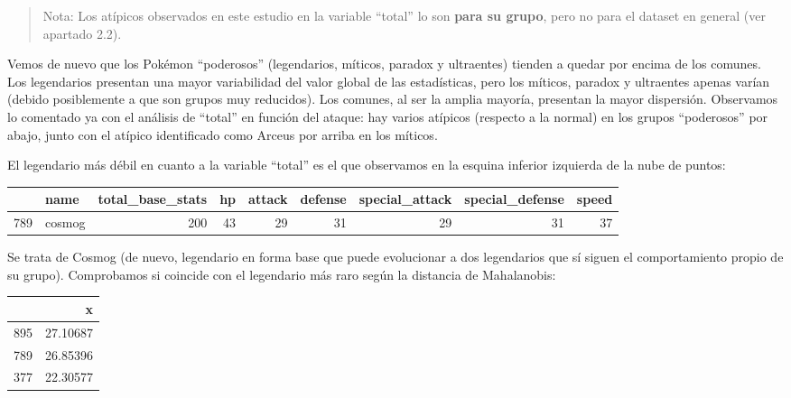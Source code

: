 \documentclass[
  12pt,
]{extreport}
\begin{document}
\begin{quote}
Nota: Los atípicos observados en este estudio en la variable ``total''
lo son \textbf{para su grupo}, pero no para el dataset en general (ver
apartado 2.2).
\end{quote}

Vemos de nuevo que los Pokémon ``poderosos'' (legendarios, míticos,
paradox y ultraentes) tienden a quedar por encima de los comunes. Los
legendarios presentan una mayor variabilidad del valor global de las
estadísticas, pero los míticos, paradox y ultraentes apenas varían
(debido posiblemente a que son grupos muy reducidos). Los comunes, al
ser la amplia mayoría, presentan la mayor dispersión. Observamos lo
comentado ya con el análisis de ``total'' en función del ataque: hay
varios atípicos (respecto a la normal) en los grupos ``poderosos'' por
abajo, junto con el atípico identificado como Arceus por arriba en los
míticos.

El legendario más débil en cuanto a la variable ``total'' es el que
observamos en la esquina inferior izquierda de la nube de puntos:

\begin{table}[H]
\centering\begingroup\fontsize{9.5}{11.5}\selectfont

\begin{tabular}{llrrrrrrr}
\toprule
  & name & total\_base\_stats & hp & attack & defense & special\_attack & special\_defense & speed\\
\midrule
789 & cosmog & 200 & 43 & 29 & 31 & 29 & 31 & 37\\
\bottomrule
\end{tabular}
\endgroup{}
\end{table}

Se trata de Cosmog (de nuevo, legendario en forma base que puede
evolucionar a dos legendarios que sí siguen el comportamiento propio de
su grupo). Comprobamos si coincide con el legendario más raro según la
distancia de Mahalanobis:

\begin{table}[H]
\centering\begingroup\fontsize{9.5}{11.5}\selectfont

\begin{tabular}{lr}
\toprule
  & x\\
\midrule
895 & 27.10687\\
789 & 26.85396\\
377 & 22.30577\\
\bottomrule
\end{tabular}
\endgroup{}
\end{table}
\end{document}
